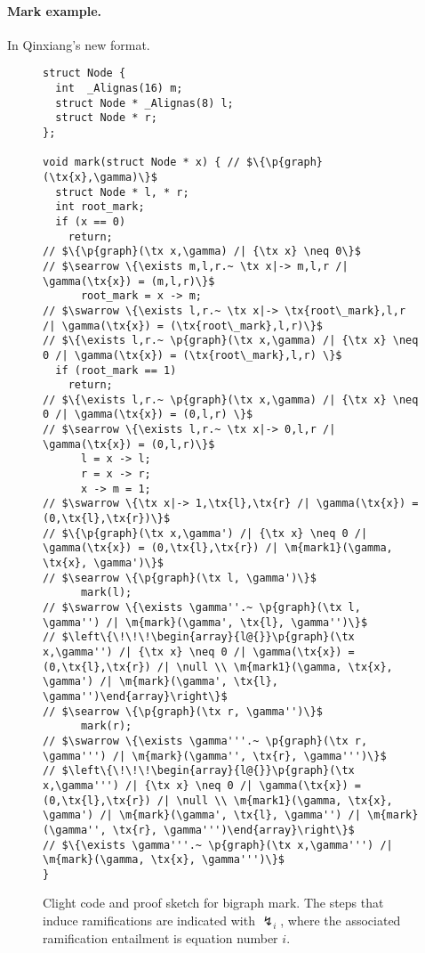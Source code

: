 \paragraph{Mark example.} In Qinxiang's new format.

\newcommand{\tx}[1]{\text{#1}}
\newcommand{\p}[1]{\ensuremath{\mathsf{#1}}} %
\newcommand{\m}[1]{\ensuremath{\mathit{#1}}} %
\let\ramify\lightning

\begin{figure}
  \begin{lstlisting}
struct Node {
  int  _Alignas(16) m;
  struct Node * _Alignas(8) l;
  struct Node * r;
};

void mark(struct Node * x) { // $\{\p{graph}(\tx{x},\gamma)\}$
  struct Node * l, * r;
  int root_mark;
  if (x == 0)
    return;
// $\{\p{graph}(\tx x,\gamma) /| {\tx x} \neq 0\}$
// $\searrow \{\exists m,l,r.~ \tx x|-> m,l,r /| \gamma(\tx{x}) = (m,l,r)\}$
      root_mark = x -> m;
// $\swarrow \{\exists l,r.~ \tx x|-> \tx{root\_mark},l,r /| \gamma(\tx{x}) = (\tx{root\_mark},l,r)\}$
// $\{\exists l,r.~ \p{graph}(\tx x,\gamma) /| {\tx x} \neq 0 /| \gamma(\tx{x}) = (\tx{root\_mark},l,r) \}$
  if (root_mark == 1)
    return;
// $\{\exists l,r.~ \p{graph}(\tx x,\gamma) /| {\tx x} \neq 0 /| \gamma(\tx{x}) = (0,l,r) \}$
// $\searrow \{\exists l,r.~ \tx x|-> 0,l,r /| \gamma(\tx{x}) = (0,l,r)\}$
      l = x -> l;
      r = x -> r;
      x -> m = 1;
// $\swarrow \{\tx x|-> 1,\tx{l},\tx{r} /| \gamma(\tx{x}) = (0,\tx{l},\tx{r})\}$
// $\{\p{graph}(\tx x,\gamma') /| {\tx x} \neq 0 /| \gamma(\tx{x}) = (0,\tx{l},\tx{r}) /| \m{mark1}(\gamma, \tx{x}, \gamma')\}$
// $\searrow \{\p{graph}(\tx l, \gamma')\}$
      mark(l);
// $\swarrow \{\exists \gamma''.~ \p{graph}(\tx l, \gamma'') /| \m{mark}(\gamma', \tx{l}, \gamma'')\}$
// $\left\{\!\!\!\begin{array}{l@{}}\p{graph}(\tx x,\gamma'') /| {\tx x} \neq 0 /| \gamma(\tx{x}) = (0,\tx{l},\tx{r}) /| \null \\ \m{mark1}(\gamma, \tx{x}, \gamma') /| \m{mark}(\gamma', \tx{l}, \gamma'')\end{array}\right\}$
// $\searrow \{\p{graph}(\tx r, \gamma'')\}$
      mark(r);
// $\swarrow \{\exists \gamma'''.~ \p{graph}(\tx r, \gamma''') /| \m{mark}(\gamma'', \tx{r}, \gamma''')\}$
// $\left\{\!\!\!\begin{array}{l@{}}\p{graph}(\tx x,\gamma''') /| {\tx x} \neq 0 /| \gamma(\tx{x}) = (0,\tx{l},\tx{r}) /| \null \\ \m{mark1}(\gamma, \tx{x}, \gamma') /| \m{mark}(\gamma', \tx{l}, \gamma'') /| \m{mark}(\gamma'', \tx{r}, \gamma''')\end{array}\right\}$
// $\{\exists \gamma'''.~ \p{graph}(\tx x,\gamma''') /| \m{mark}(\gamma, \tx{x}, \gamma''')\}$
}
\end{lstlisting}
\caption{Clight code and proof sketch for bigraph mark. {\color{magenta} The steps that induce
  ramifications are indicated with $\ramify_i$, where the associated ramification entailment is equation number $i$.}} %
\label{fig:markgraph}


\end{figure}
